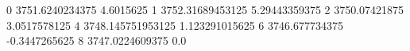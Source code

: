 0 3751.6240234375 4.6015625
1 3752.31689453125 5.29443359375
2 3750.07421875 3.0517578125
4 3748.145751953125 1.123291015625
6 3746.677734375 -0.3447265625
8 3747.0224609375 0.0
